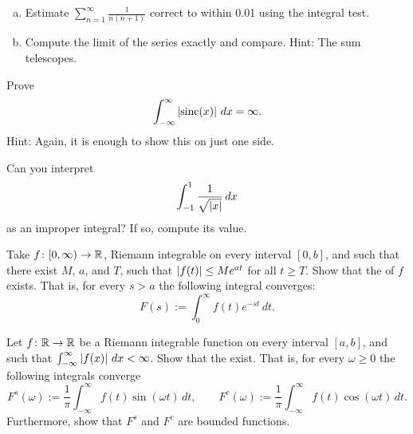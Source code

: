 \begin{exercise}
\leavevmode
\begin{enumerate}[a)]
\item
Estimate $\sum_{n=1}^\infty \frac{1}{n(n+1)}$ correct to within 0.01
using the integral test.
\item
Compute the limit of the series exactly
and compare.  Hint: The sum telescopes.
\end{enumerate}
\end{exercise}

\begin{exercise}
Prove 
\begin{equation*}
\int_{-\infty}^\infty \left\lvert {\operatorname{sinc}(x)} \right\rvert\,dx = \infty .
\end{equation*}
Hint: Again, it is enough to show this on just one side.
\end{exercise}

\begin{exercise}
Can you interpret
\begin{equation*}
\int_{-1}^1 \frac{1}{\sqrt{\left\lvert {x} \right\rvert}}\,dx
\end{equation*}
as an improper integral?  If so, compute its value.
\end{exercise}

\begin{exercise}
Take $f \colon [0,\infty) \to {\mathbb{R}}$, Riemann integrable on
every interval $[0,b]$, and such that there exist $M$, $a$, and $T$,
such that $\left\lvert {f(t)} \right\rvert \leq M e^{at}$ for all $t \geq T$.  Show that the
\emph{} of $f$ exists.  That is, for
every $s > a$ the following integral converges:
\begin{equation*}
F(s) := \int_{0}^\infty f(t) e^{-st} \,dt .
\end{equation*}
\end{exercise}

\begin{exercise}
Let $f \colon {\mathbb{R}} \to {\mathbb{R}}$ be a Riemann integrable function
on every interval $[a,b]$, and such
that $\int_{-\infty}^\infty \left\lvert {f(x)} \right\rvert\,dx < \infty$.  Show that the
\emph{}
exist.  That is, for every $\omega \geq 0$ the
following integrals converge
\begin{equation*}
F^s(\omega) := \frac{1}{\pi} \int_{-\infty}^\infty f(t) \sin(\omega t) \,dt ,
\qquad
F^c(\omega) := \frac{1}{\pi} \int_{-\infty}^\infty f(t) \cos(\omega t) \,dt .
\end{equation*}
Furthermore, show that $F^s$ and $F^c$ are bounded functions.
\end{exercise}

